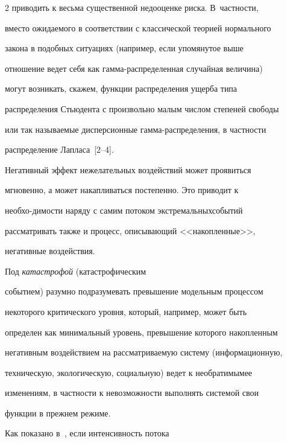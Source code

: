 \begin{multicols}{2}
приводить к весьма существенной недооценке риска. В~частности,


вместо ожидаемого в соответствии с классической теорией нормального


закона в подобных ситуациях (например, если упомянутое выше


отношение ведет себя как гам\-ма-рас\-пре\-де\-лен\-ная случайная величина)


могут возникать, скажем, функции распределения ущерба типа


распределения Стьюдента с произвольно малым числом степеней свободы


или так называемые дисперсионные гам\-ма-рас\-пре\-де\-ле\-ния, в част\-ности


распределение Лапласа~[2--4].





Негативный эффект нежелательных воздействий может проявиться


мгновенно, а может накапливаться постепенно. Это приводит к


не\-обхо-\linebreak ди\-мости наряду с самим потоком экстремальных\linebreak событий


рассматривать также и процесс, описывающий <<накопленные>>,


негативные воздействия. 





Под {\it катастрофой} (катастрофическим


событием) разумно подразумевать превышение модельным процессом


некоторого критического уровня, который, например, может быть


определен как минимальный уровень, превышение которого накопленным


негативным воздействием на рассматриваемую систему (информационную,


техническую, экологическую, социальную) ведет к необратимым\linebreak ее


изменениям, в частности к невозможности выполнять системой свои


функции в прежнем ре\-жиме.





Как показано в~\cite{KorolevSokolov2008}, если интенсивность пото\-ка



\end{multicols}
